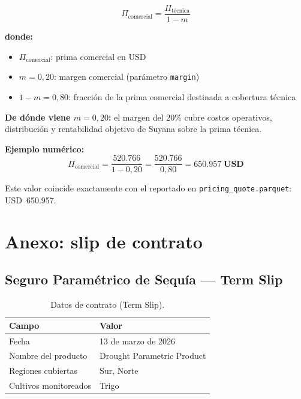 \documentclass[11pt,a4paper]{article}
\begin{document}
\begin{equation}
  \Pi_{\text{comercial}} = \frac{\Pi_{\text{técnica}}}{1 - m}
\end{equation}

\textbf{donde:}
\begin{itemize}
  \item $\Pi_{\text{comercial}}$: prima comercial en USD
  \item $m = 0{,}20$: margen comercial (parámetro \texttt{margin})
  \item $1 - m = 0{,}80$: fracción de la prima comercial destinada a cobertura técnica
\end{itemize}

\textbf{De dónde viene $m = 0{,}20$:} el margen del 20\% cubre costos operativos, distribución y rentabilidad objetivo de Suyana sobre la prima técnica.

\textbf{Ejemplo numérico:}
\[
  \Pi_{\text{comercial}} = \frac{520.766}{1 - 0{,}20} = \frac{520.766}{0{,}80} = \mathbf{650.957\;\text{USD}}
\]

Este valor coincide exactamente con el reportado en \texttt{pricing\_quote.parquet}: USD~650.957.

\section{Anexo: slip de contrato}
\label{sec:slip}

\subsection*{Seguro Paramétrico de Sequía --- Term Slip}

\renewcommand{\arraystretch}{1.3}
\begin{table}[ht]
  \centering
  \caption{Datos de contrato (Term Slip).}
  \label{tab:slip_header}
  \begin{tabular}{ll}
    \toprule
    \textbf{Campo} & \textbf{Valor} \\
    \midrule
    Fecha                   & 13 de marzo de 2026 \\
    Nombre del producto     & Drought Parametric Product \\
    Regiones cubiertas      & Sur, Norte \\
    Cultivos monitoreados   & Trigo \\
    \bottomrule
  \end{tabular}
\end{table}
\end{document}
